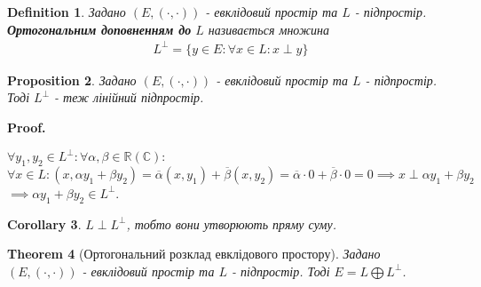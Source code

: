 \documentclass[a4paper, 10pt]{article}
\makeatletter
\theoremstyle{theoremdd}
\newtheorem{theorem}{Theorem}[subsection]
\newtheorem{definition}[theorem]{Definition}
\newtheorem{proposition}[theorem]{Proposition}
\newtheorem{corollary}[theorem]{Corollary}
\renewenvironment{proof}[1][Proof.\\]{\par
\pushQED{\hfill \qed}%
\normalfont \topsep6\p@\@plus6\p@\relax
\trivlist
\item\relax
{\bfseries
#1\@addpunct{.}}\hspace\labelsep\ignorespaces
}{%
\popQED\endtrivlist\@endpefalse
}
\makeatother
\begin{document}
\begin{definition}
Задано $(E, (\cdot,\cdot))$ - евклідовий простір та $L$ - підпростір.\\
\textbf{Ортогональним доповненням до} $L$ називається множина
\begin{align*}
L^{\perp} = \{y \in E: \forall x \in L: x \perp y\}
\end{align*}
\end{definition}

\begin{proposition}
Задано $(E, (\cdot,\cdot))$ - евклідовий простір та $L$ - підпростір.\\
Тоді $L^{\perp}$ - теж лінійний підпростір.
\end{proposition}

\begin{proof}
$\forall y_1,y_2 \in L^{\perp}: \forall \alpha,\beta \in \mathbb{R} (\mathbb{C}):$\\
$\forall x \in L: (x, \alpha y_1+ \beta y_2) = \overline{\alpha} (x,y_1) + \overline{\beta} (x,y_2) = \overline{\alpha} \cdot 0 + \overline{\beta} \cdot 0 = 0 \implies x \perp \alpha y_1 + \beta y_2$\\
$\implies \alpha y_1 + \beta y_2 \in L^{\perp}$.
\end{proof}

\begin{corollary}
$L \perp L^\perp$, тобто вони утворюють пряму суму.
\end{corollary}

\begin{theorem}[Ортогональний розклад евклідового простору]
Задано $(E, (\cdot,\cdot))$ - евклідовий простір та $L$ - підпростір.
Тоді $E = L \bigoplus L^{\perp}$.
\end{theorem}
\end{document}
